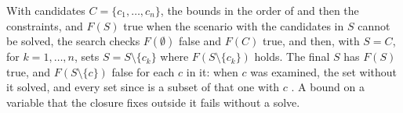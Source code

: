 
With candidates $C = \{c_1, \ldots, c_n\}$, the bounds in the order of
 and then the constraints, and $F(S)$ true when the
scenario with the candidates in $S$ cannot be solved, the search checks
$F(\emptyset)$ false and $F(C)$ true, and then, with $S = C$, for $k = 1,
\ldots, n$, sets $S = S \setminus \{c_k\}$ where $F(S \setminus \{c_k\})$
holds. The final $S$ has $F(S)$ true, and $F(S \setminus \{c\})$ false for
each $c$ in it: when $c$ was examined, the set without it solved, and every
set since is a subset of that one with $c$ \citep{chinneck1991}. A bound on
a variable that the closure fixes outside it fails without a solve.


\begin{alsosee}
\end{alsosee}
